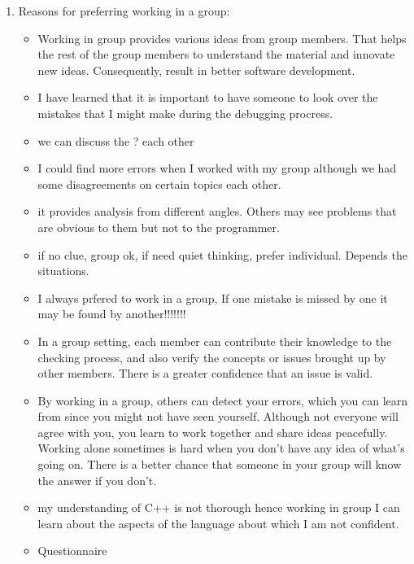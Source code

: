 \begin{enumerate}
\item  Reasons for preferring working in a group:
\begin{itemize}
\item 
Working in group provides various ideas from group members.  That
helps the rest of the group members to understand the material and
innovate new ideas.  Consequently, result in better software development.
\item I have learned that it is important to have someone to look over the
mistakes that I might make during the debugging procress.
\item  
we can discuss the ? each other
\item I could find more errors when I worked with my group although we had
some disagreements on certain topics each other.
\item it provides analysis from different angles. Others may see problems
that are obvious to them but not to the programmer.
\item if no clue, group ok, if need quiet thinking, prefer
individual. Depends the situations.
\item I always prfered to work in a group, If one mistake is missed by one
it may be found by another!!!!!!!

\item In a group setting, each member can contribute their knowledge to the
checking process, and also verify the concepts or issues brought up by
other members.  There is a greater confidence that an issue is valid.
\item By working in a group, others can detect your errors, which you can
learn from since you might not have seen yourself.  Although not everyone will agree with you, you learn to
work together and share ideas peacefully.  Working alone sometimes is
hard when you don't have any idea of what's going on.  There is a
better chance that someone in your group will know the answer if you
don't.

\item my understanding of C++ is not thorough hence working in group I can
learn about the aspects of the language about which I am not confident.
\item Questionnaire


\end{itemize}
\end{enumerate}
